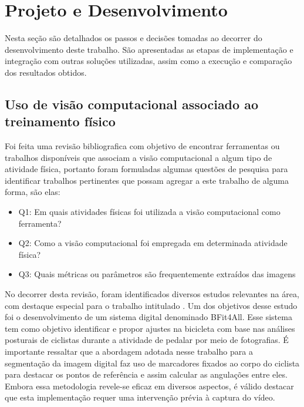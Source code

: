 \chapter{Projeto e Desenvolvimento}
Nesta seção são detalhados os passos e decisões tomadas ao decorrer do desenvolvimento deste trabalho. São apresentadas as etapas de implementação e integração com outras soluções utilizadas, assim como a execução e comparação dos resultados obtidos.

\section[Uso de visão computacional associado ao treinamento físico]{Uso de visão computacional associado ao treinamento físico}\label{sec:Uso de visao computacional associado ao treinamento fisico}

Foi feita uma revisão bibliografica com objetivo de encontrar ferramentas ou trabalhos disponíveis que associam a visão computacional a algum tipo de atividade física, portanto foram formuladas algumas questões de pesquisa para identificar trabalhos pertinentes que possam agregar a este trabalho de alguma forma, são elas:
 \begin{itemize}
   \item Q1: Em quais atividades físicas foi utilizada a visão computacional como ferramenta?
   \item Q2: Como a visão computacional foi empregada em determinada atividade física?
   \item Q3: Quais métricas ou parâmetros são frequentemente extraídos das imagens
 \end{itemize}

No decorrer desta revisão, foram identificados diversos estudos relevantes na área, com destaque especial para o trabalho intitulado  \cite{vcBicicleta}. Um dos objetivos desse estudo foi o desenvolvimento de um sistema digital denominado BFit4All. Esse sistema tem como objetivo identificar e propor ajustes na bicicleta com base nas análises posturais de ciclistas durante a atividade de pedalar por meio de fotografias. É importante ressaltar que a abordagem adotada nesse trabalho para a segmentação da imagem digital faz uso de marcadores fixados ao corpo do ciclista para destacar os pontos de referência e assim calcular as angulações entre eles. Embora essa metodologia revele-se eficaz em diversos aspectos, é válido destacar que esta implementação requer uma intervenção prévia à captura do vídeo.


